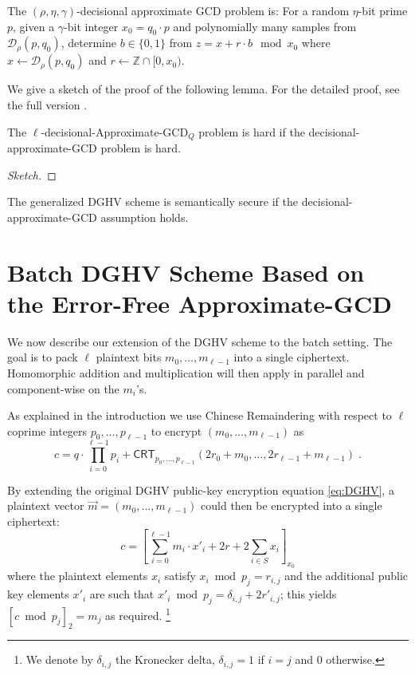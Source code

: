 \documentclass[11pt]{llncs}
\newcommand{\Z}{{\mathbb Z}}
\newcommand*{\crt}{\ensuremath{\mathsf{CRT}}}
\newcommand*\D{\ensuremath{\mathcal D}}
\begin{document}
\begin{definition}
The $(\rho,\eta,\gamma)$-decisional approximate GCD problem is: For a random $\eta$-bit prime $p$, given a $\gamma$-bit integer  $x_0=q_0\cdot p$ and polynomially many samples from $\D_{\rho}(p,q_0)$,
determine $b\in\{0,1\}$ from $z=x+r\cdot b\mod x_0$ where $x\gets\D_{\rho}(p,q_0)$ and $r\gets\Z\cap[0,x_0)$.
\end{definition}

We give a sketch of the proof of the following lemma. For the detailed proof, see the full version \cite{KLYC2013}. 
\begin{lemma}
\label{le:redsec}
The $\ell$-decisional-Approximate-GCD$_Q$ problem is hard if the
decisional-approximate-GCD problem is hard.
\end{lemma}
\begin{proof}[Sketch]


\end{proof}
\begin{corollary}
The generalized DGHV scheme is semantically secure if the
decisional-approximate-GCD assumption holds.
\end{corollary}

\section{Batch DGHV Scheme Based on the Error-Free Approximate-GCD}\label{sec:batch-error-free}


We now describe our extension of the DGHV scheme to the batch setting. The goal is to
pack $\ell$ plaintext bits $m_0,\ldots,m_{\ell-1}$ into a single ciphertext. 
Homomorphic addition and multiplication will then apply in parallel
and component-wise on the $m_i$'s. 

As explained in the introduction we use Chinese Remaindering with respect
to $\ell$ coprime integers $p_0,\ldots,p_{\ell-1}$ to encrypt
$(m_0,\ldots,m_{\ell-1})$ as
\[
c = q\cdot \prod\limits_{i=0}^{\ell-1} p_i +
    \crt_{p_0,\ldots,p_{\ell-1}}(2r_0+m_0,\ldots,2r_{\ell-1}+m_{\ell-1})\;. 
\]

By extending the original DGHV public-key encryption equation
\eqref{eq:DGHV}, a plaintext vector  $\vec m=(m_0,\ldots,m_{\ell-1})$
could then be encrypted into a single ciphertext:
\begin{equation}
\label{eq:cbatch}
c = \left[\sum_{i=0}^{\ell-1} m_i\cdot x'_i + 2r +
  2\sum\limits_{i\in S} x_i\right]_{x_0}
\end{equation}
where the plaintext elements $x_i$ satisfy $x_i \bmod p_j=r_{i,j}$ and
the additional public key elements $x'_i$ are such that $x'_i\bmod
p_j=\delta_{i,j}+2r'_{i,j}$; this yields $[c\bmod p_j]_2=m_j$ as
required.%
\footnote{We denote by $\delta_{i,j}$ the Kronecker delta,
$\delta_{i,j}=1$ if $i=j$ and $0$ otherwise.}
\end{document}
